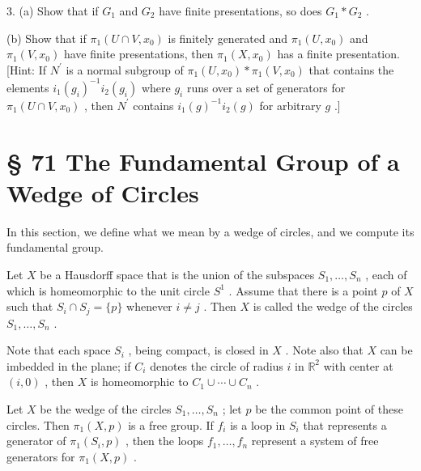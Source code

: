 3. (a) Show that if \({G}_{1}\) and \({G}_{2}\) have finite presentations, so does \({G}_{1} * {G}_{2}\) .

(b) Show that if \({\pi }_{1}\left( {U \cap  V,{x}_{0}}\right)\) is finitely generated and \({\pi }_{1}\left( {U,{x}_{0}}\right)\) and \({\pi }_{1}\left( {V,{x}_{0}}\right)\) have finite presentations, then \({\pi }_{1}\left( {X,{x}_{0}}\right)\) has a finite presentation. [Hint: If \({N}^{\prime }\) is a normal subgroup of \({\pi }_{1}\left( {U,{x}_{0}}\right)  * {\pi }_{1}\left( {V,{x}_{0}}\right)\) that contains the elements \({i}_{1}{\left( {g}_{i}\right) }^{-1}{i}_{2}\left( {g}_{i}\right)\) where \({g}_{i}\) runs over a set of generators for \({\pi }_{1}\left( {U \cap  V,{x}_{0}}\right)\) , then \({N}^{\prime }\) contains \({i}_{1}{\left( g\right) }^{-1}{i}_{2}\left( g\right)\) for arbitrary \(g\) .]

\section*{§ 71 The Fundamental Group of a Wedge of Circles}

In this section, we define what we mean by a wedge of circles, and we compute its fundamental group.

\begin{definition} Let \(X\) be a Hausdorff space that is the union of the subspaces \({S}_{1},\ldots ,{S}_{n}\) , each of which is homeomorphic to the unit circle \({S}^{1}\) . Assume that there is a point \(p\) of \(X\) such that \({S}_{i} \cap  {S}_{j} = \{ p\}\) whenever \(i \neq  j\) . Then \(X\) is called the wedge of the circles \({S}_{1},\ldots ,{S}_{n}\) .
\end{definition}

Note that each space \({S}_{i}\) , being compact, is closed in \(X\) . Note also that \(X\) can be imbedded in the plane; if \({C}_{i}\) denotes the circle of radius \(i\) in \({\mathbb{R}}^{2}\) with center at \(\left( {i,0}\right)\) , then \(X\) is homeomorphic to \({C}_{1} \cup  \cdots  \cup  {C}_{n}\) .

\begin{theorem} Let \(X\) be the wedge of the circles \({S}_{1},\ldots ,{S}_{n}\) ; let \(p\) be the common point of these circles. Then \({\pi }_{1}\left( {X,p}\right)\) is a free group. If \({f}_{i}\) is a loop in \({S}_{i}\) that represents a generator of \({\pi }_{1}\left( {{S}_{i},p}\right)\) , then the loops \({f}_{1},\ldots ,{f}_{n}\) represent a system of free generators for \({\pi }_{1}\left( {X,p}\right)\) .
\end{theorem}

